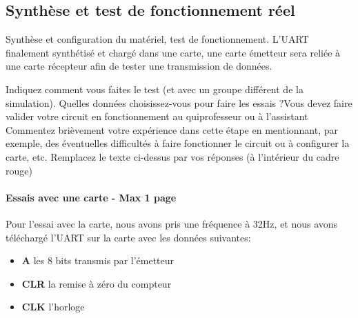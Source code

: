 \documentclass[a4paper]{article} %
\begin{document}
 \subsection{Synthèse et test de fonctionnement réel}
Synthèse et configuration du matériel, test de fonctionnement.
L’UART finalement synthétisé et chargé dans une carte, une carte émetteur sera reliée à une carte récepteur afin de tester une transmission de données. 


\begin{tcolorbox}[colframe=Monokaimagenta,colback=white]

Indiquez comment vous faites le test (et avec un groupe différent de la simulation). Quelles données choisissez-vous pour faire les essais ?Vous devez faire valider votre circuit en fonctionnement au quiprofesseur ou à l’assistant
Commentez brièvement votre expérience dans cette étape en mentionnant, par exemple, des éventuelles difficultés à faire fonctionner le circuit ou à configurer la carte, etc.
Remplacez le texte ci-dessus par vos réponses (à l’intérieur du cadre rouge)\\

\paragraph{Essais avec une carte - Max 1 page}
Pour l'essai avec la carte, nous avons pris une fréquence à 32Hz, et nous avons téléchargé l'UART sur la carte avec les données suivantes:
\begin{itemize}
    \item     \textbf{A} les 8 bits transmis par l'émetteur
    \item     \textbf{CLR} la remise à zéro du compteur
    \item     \textbf{CLK} l'horloge
\end{itemize}


\end{tcolorbox}
\end{document}

